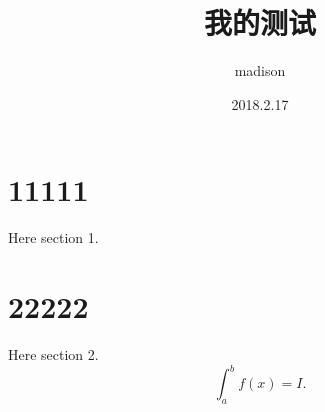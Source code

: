 \documentclass{article}
\title{我的测试}
\author{madison}
\date{2018.2.17}
\begin{document}
\maketitle
\section{11111}
Here section 1.
\section{22222}
Here section 2.
\begin{equation}
\int_a^bf(x)=I.
\end{equation}
\end{document}

